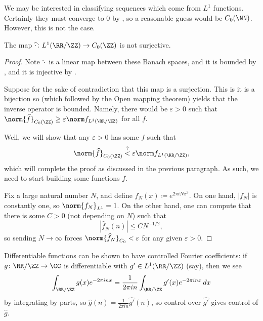 \documentclass[../notes.tex]{subfiles}
\begin{document}
We may be interested in classifying sequences which come from $L^1$ functions. Certainly they must converge to $0$ by , so a reasonable guess would be $C_0(\NN)$. However, this is not the case.
\begin{proposition}
	The map $\widehat\cdot\colon L^1(\RR/\ZZ)\to C_0(\ZZ)$ is not surjective.
\end{proposition}
\begin{proof}
	Note $\widehat\cdot$ is a linear map between these Banach spaces, and it is bounded by , and it is injective by .

	Suppose for the sake of contradiction that this map is a surjection. This is it is a bijection so  (which followed by the Open mapping theorem) yields that the inverse operator is bounded. Namely, there would be $\varepsilon>0$ such that $\norm{\widehat f}_{C_0(\ZZ)}\ge\varepsilon\norm f_{L^1(\RR/\ZZ)}$ for all $f$.

	Well, we will show that any $\varepsilon>0$ has some $f$ such that
	\[\norm{\widehat f}_{C_0(\ZZ)}\stackrel?<\varepsilon\norm f_{L^1(\RR/\ZZ)},\]
	which will complete the proof as discussed in the previous paragraph. As such, we need to start building some functions $f$.
	
	Fix a large natural number $N$, and define $f_N(x)\coloneqq e^{2\pi iNx^2}$. On one hand, $\left|f_N\right|$ is constantly one, so $\norm{f_N}_{L^1}=1$. On the other hand, one can compute that there is some $C>0$ (not depending on $N$) such that
	\[\left|\widehat f_N(n)\right|\le CN^{-1/2},\]
	so sending $N\to\infty$ forces $\norm{\widehat f_N}_{C_0}<\varepsilon$ for any given $\varepsilon>0$.
\end{proof}
\begin{remark}
	Differentiable functions can be shown to have controlled Fourier coefficients: if $g\colon\RR/\ZZ\to\CC$ is differentiable with $g'\in L^1(\RR/\ZZ)$ (say), then we see
	\[\int_{\RR/\ZZ}g(x)e^{-2\pi inx}=\frac1{2\pi in}\int_{\RR/\ZZ}g'(x)e^{-2\pi inx}\,dx\]
	by integrating by parts, so $\widehat g(n)=\frac1{2\pi in}\widehat{g'}(n)$, so control over $\widehat{g'}$ gives control of $\widehat g$.
\end{remark}
\end{document}
